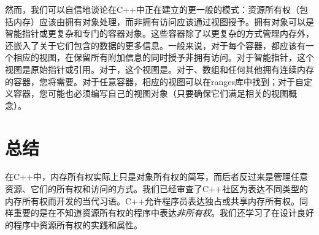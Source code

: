 然而，我们可以自信地谈论在C++中正在建立的更一般的模式：资源所有权（包括内存）应该由拥有对象处理，而非拥有访问应该通过视图授予。拥有对象可以是智能指针或更复杂和专门的容器对象。这些容器除了以更复杂的方式管理内存外，还嵌入了关于它们包含的数据的更多信息。一般来说，对于每个容器，都应该有一个相应的视图，在保留所有附加信息的同时授予非拥有访问。对于智能指针，这个视图是原始指针或引用。对于，这个视图是。对于、数组和任何其他拥有连续内存的容器，您将需要。对于任意容器，相应的视图可以在\cpp[20]  ranges库中找到；对于自定义容器，您可能也必须编写自己的视图对象（只要确保它们满足相关的视图概念）。

\section{总结}

在C++中，内存所有权实际上只是对象所有权的简写，而后者反过来是管理任意资源、它们的所有权和访问的方式。我们已经审查了C++社区为表达不同类型的内存所有权而开发的当代习语。C++允许程序员表达独占或共享内存所有权。同样重要的是在不知道资源所有权的程序中表达\emph{非所有权}。我们还学习了在设计良好的程序中资源所有权的实践和属性。

